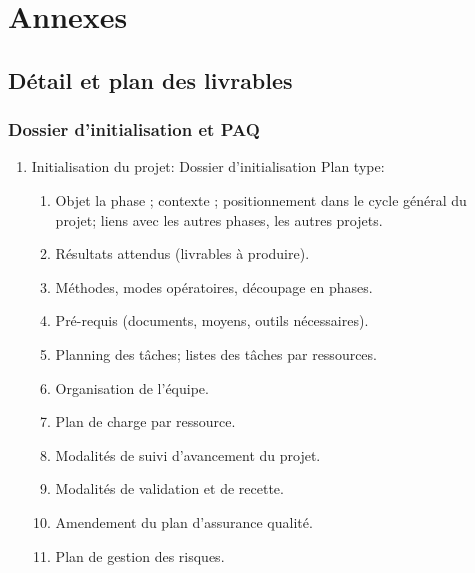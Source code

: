 \vfil
\pagebreak
\section{Annexes}


\subsection{Détail et plan des livrables}

\subsubsection{Dossier d'initialisation et PAQ}
		\begin{enumerate}
			\item Initialisation du projet:
				Dossier d'initialisation
					Plan type:
						\begin{enumerate}
							\item Objet la phase ; contexte ; positionnement
                                dans le cycle général du projet; liens avec
                                les autres phases, les autres projets.
							\item Résultats attendus (livrables à produire).
							\item Méthodes, modes opératoires, découpage en 
                                    phases.
							\item Pré-requis (documents, moyens, outils
                                    nécessaires).
							\item Planning des tâches; listes des tâches par
                                    ressources.
							\item Organisation de l'équipe.
							\item Plan de charge par ressource.
							\item Modalités de suivi d'avancement du projet.
							\item Modalités de validation et de recette.
							\item Amendement du plan d'assurance qualité.
							\item Plan de gestion des risques.
						\end{enumerate}
		\end{enumerate}
